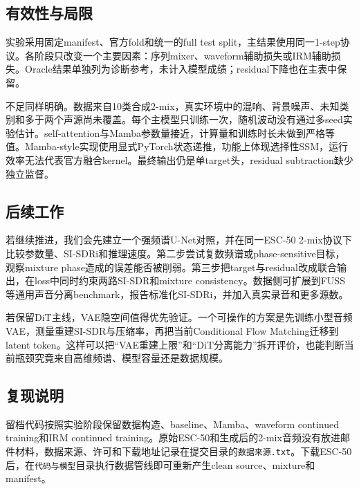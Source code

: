\documentclass[UTF8,12pt,a4paper]{ctexart}
\newcommand{\code}[1]{\texttt{#1}}
\begin{document}
\subsection{有效性与局限}

实验采用固定manifest、官方fold和统一的full test split，主结果使用同一1-step协议。各阶段只改变一个主要因素：序列mixer、waveform辅助损失或IRM辅助损失。Oracle结果单独列为诊断参考，未计入模型成绩；residual下降也在主表中保留。

不足同样明确。数据来自10类合成2-mix，真实环境中的混响、背景噪声、未知类别和多于两个声源尚未覆盖。每个主模型只训练一次，随机波动没有通过多seed实验估计。self-attention与Mamba参数量接近，计算量和训练时长未做到严格等值。Mamba-style实现使用显式PyTorch状态递推，功能上体现选择性SSM，运行效率无法代表官方融合kernel。最终输出仍是单target头，residual subtraction缺少独立监督。

\subsection{后续工作}

若继续推进，我们会先建立一个强频谱U-Net对照，并在同一ESC-50 2-mix协议下比较参数量、SI-SDRi和推理速度。第二步尝试复数频谱或phase-sensitive目标，观察mixture phase造成的误差能否被削弱。第三步把target与residual改成联合输出，在loss中同时约束两路SI-SDR和mixture consistency。数据侧可扩展到FUSS等通用声音分离benchmark，报告标准化SI-SDRi，并加入真实录音和更多源数。

若保留DiT主线，VAE隐空间值得优先验证。一个可操作的方案是先训练小型音频VAE，测量重建SI-SDR与压缩率，再把当前Conditional Flow Matching迁移到latent token。这样可以把“VAE重建上限”和“DiT分离能力”拆开评价，也能判断当前瓶颈究竟来自高维频谱、模型容量还是数据规模。

\subsection{复现说明}

留档代码按照实验阶段保留数据构造、baseline、Mamba、waveform continued training和IRM continued training。原始ESC-50和生成后的2-mix音频没有放进邮件材料，数据来源、许可和下载地址记录在提交目录的\code{数据来源.txt}。下载ESC-50后，在\code{代码与模型}目录执行数据管线即可重新产生clean source、mixture和manifest。
\end{document}
